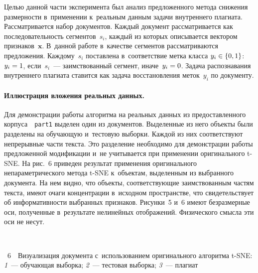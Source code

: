 \begin{multicols}{2}
Целью данной части эксперимента был анализ предложенного метода 
снижения размерности в~применении к~реальным данным задачи внутреннего плагиата. 
Рассматривается набор документов. Каждый документ рассматривается как 
последовательность сегментов~$s_i$, каждый из которых описывается вектором 
признаков~$\mathbf x$. В~данной работе в~качестве сегментов рассматриваются 
предложения. Каждому~$s_i$ поставлена в~соответствие метка класса 
$ y_i \hm\in \{0, 1\}$: $y_i \hm= 1$, если~$s_i$~--- заимствованный сегмент, 
иначе~$y_i \hm= 0$. Задача распознавания внутреннего плагиата ставится 
как задача восстановления меток~$y_i$ по документу.

\vspace*{-7pt}

\paragraph*{Иллюстрация вложения реальных данных.}

Для демонстрации работы алгоритма на реальных данных из 
предоставленного корпуса~\cite{Pan2011Collection}~\verb"part1" выделен один 
из документов. Выделенные из него объекты были разделены на обучающую и~тестовую 
выборки. Каждой из них соответствуют непрерывные части текста. Это разделение 
необходимо для демонстрации работы предложенной модификации и~не учитывается 
при применении оригинального t-SNE. На рис.~6 приведен результат 
применения оригинального непараметрического метода t-SNE к~объектам, выделенным 
из выбранного документа. На нем видно, что объекты, соответствующие заимствованным 
частям текста, имеют очаги концентрации в~исходном пространстве, что 
свидетельствует об информативности выбранных признаков.
Рисунки~5 и~6 имеют безразмерные оси, полученные в~результате нелинейных отображений.
Физического смысла эти оси не несут.

 { \begin{center}  %
 \vspace*{7pt}
 \mbox{%
\epsfxsize=73.201mm
}


\end{center}


\noindent
{{\figurename~6}\ \ \small{Визуализация документа с~использованием оригинального алгоритма t-SNE:
\textit{1}~--- обучающая выборка; \textit{2}~--- тестовая выборка; 
\textit{3}~--- плагиат}}

}

\vspace*{10pt}







\end{multicols}
